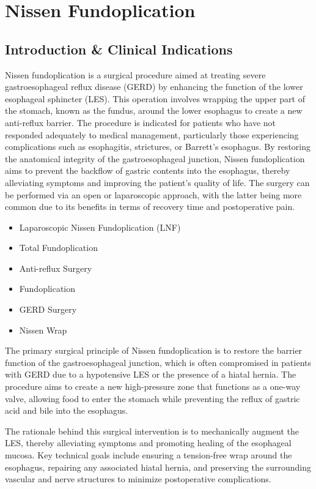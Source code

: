 \chapter{Nissen Fundoplication}

\section*{Introduction \& Clinical Indications}
Nissen fundoplication is a surgical procedure aimed at treating severe gastroesophageal reflux disease (GERD) by enhancing the function of the lower esophageal sphincter (LES). This operation involves wrapping the upper part of the stomach, known as the fundus, around the lower esophagus to create a new anti-reflux barrier. The procedure is indicated for patients who have not responded adequately to medical management, particularly those experiencing complications such as esophagitis, strictures, or Barrett's esophagus. By restoring the anatomical integrity of the gastroesophageal junction, Nissen fundoplication aims to prevent the backflow of gastric contents into the esophagus, thereby alleviating symptoms and improving the patient's quality of life. The surgery can be performed via an open or laparoscopic approach, with the latter being more common due to its benefits in terms of recovery time and postoperative pain.

\begin{itemize}
  \item Laparoscopic Nissen Fundoplication (LNF)
  \item Total Fundoplication
  \item Anti-reflux Surgery
  \item Fundoplication
  \item GERD Surgery
  \item Nissen Wrap
\end{itemize}

The primary surgical principle of Nissen fundoplication is to restore the barrier function of the gastroesophageal junction, which is often compromised in patients with GERD due to a hypotensive LES or the presence of a hiatal hernia. The procedure aims to create a new high-pressure zone that functions as a one-way valve, allowing food to enter the stomach while preventing the reflux of gastric acid and bile into the esophagus. 

The rationale behind this surgical intervention is to mechanically augment the LES, thereby alleviating symptoms and promoting healing of the esophageal mucosa. Key technical goals include ensuring a tension-free wrap around the esophagus, repairing any associated hiatal hernia, and preserving the surrounding vascular and nerve structures to minimize postoperative complications.

